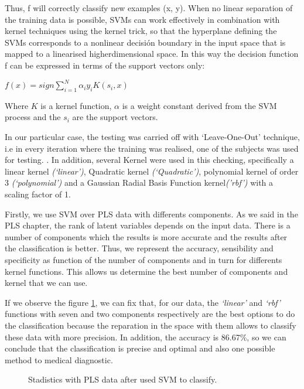 Thus, f will correctly classify new examples (x, y). When no linear separation of the training data is possible, SVMs can work effectively in combination with kernel techniques using the kernel trick, so that the hyperplane defining the SVMs corresponds to a nonlinear decisión boundary in the input space that is mapped to a linearised higherdimensional space. In this way the decision function f can be expressed in terms of the support vectors only\cite{Gorriz}:

\begin{center}
	$f(x) = sign{\sum_{i=1}^{N} \alpha_{i}y_{i}K(s_{i},x)}$
\end{center}

Where $K$ is a kernel function, $\alpha$ is a weight constant derived from the SVM process and the $s_{i}$ are the support vectors. 

In our particular case, the testing was carried off with ‘Leave-One-Out’ technique, i.e in every iteration where the training was realised, one of the subjects was used for testing. . In addition, several Kernel were used in this checking, specifically a linear kernel \textit{(‘linear’)}, Quadratic kernel \textit{(‘Quadratic’)}, polynomial kernel of order 3 \textit{(‘polynomial’)} and a Gaussian Radial Basis Function kernel\textit{('rbf')} with a scaling factor of 1.

Firstly, we use SVM over PLS data with differents components. As we said in the PLS chapter, the rank of latent variables depends on the input data. There is a number of components which the results is more accurate and the results after the classification is better. Thus, we represent the accuracy, sensibility and specificity as function of the number of components and in turn for differents kernel functions. This allows us determine the best number of components and  kernel that we can use.

If we observe the figure \ref{fig:stadistics_PLS}, we can fix that, for our data, the \textit{‘linear’} and \textit{‘rbf’} functions with seven and two components respectively are the best options to do the classification because the reparation in the space with them allows to classify these data with more precision.  In addition, the accuracy is 86.67\%, so we can conclude that the classification is precise and optimal and also one possible method to medical diagnostic.

\begin{figure}[H]
	\centering
	\caption{Stadistics with PLS data after used SVM to classify.}
	\label{fig:stadistics_PLS}
\end{figure}

